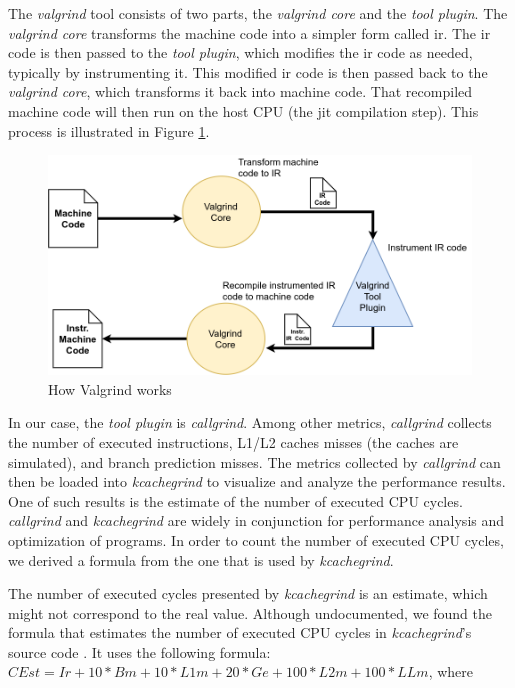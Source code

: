 \documentclass{llncs}
\begin{document}
The \textit{valgrind} tool consists of two parts, the \textit{valgrind core} and the \textit{tool
plugin}. The \textit{valgrind core} transforms the machine code into a simpler form called
\gls{ir}. The \gls{ir} code is then passed to the \textit{tool plugin}, which modifies the
\gls{ir} code as needed, typically by instrumenting it. This modified \gls{ir} code is then passed back to the
\textit{valgrind core}, which transforms it back into machine code. That recompiled machine code  will then run on the
host CPU (the \gls{jit} compilation step). This process is illustrated in Figure \ref{fig:how_valgrind_works}.

\begin{figure}
  \centering
  \includegraphics[width=1.0\textwidth]{img/how_valgrind_works.png}
  \centering \caption{\label{fig:how_valgrind_works} How Valgrind works}
\end{figure}

In our case, the \textit{tool plugin} is \textit{callgrind}. Among other metrics, \textit{callgrind}
collects the number of executed instructions, L1/L2 caches misses (the caches are simulated), and branch
prediction misses. The metrics collected by \textit{callgrind} can then be loaded into \textit{kcachegrind}
to visualize and analyze the performance results. One of such results is the estimate of the number of executed CPU cycles.
\textit{callgrind} and \textit{kcachegrind} are widely in conjunction for performance analysis and optimization
of programs. In order to count the number of executed CPU cycles, we derived a formula from
the one that is used by \textit{kcachegrind}.

The number of executed cycles
presented by \textit{kcachegrind} is an estimate, which might not correspond to the real value.
Although undocumented, we found the formula that estimates the number of executed CPU cycles in
\textit{kcachegrind}'s source code \cite{cachegrind_source:online}.
It uses the
following formula: $CEst = Ir + 10*Bm + 10*L1m + 20*Ge + 100*L2m + 100*LLm$, where
\end{document}
